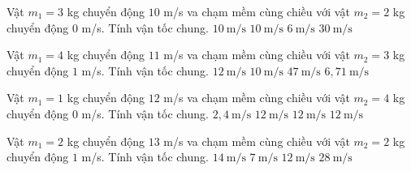 \begin{ex}
Vật $m_1=3$ kg chuyển động $10$ m/s va chạm mềm cùng chiều với vật $m_2=2$ kg chuyển động $0$ m/s. Tính vận tốc chung.
\choice
{$10\ \mathrm{m/s}$}
{$10\ \mathrm{m/s}$}
{\True $6\ \mathrm{m/s}$}
{$30\ \mathrm{m/s}$}
\end{ex}

\begin{ex}
Vật $m_1=4$ kg chuyển động $11$ m/s va chạm mềm cùng chiều với vật $m_2=3$ kg chuyển động $1$ m/s. Tính vận tốc chung.
\choice
{$12\ \mathrm{m/s}$}
{$10\ \mathrm{m/s}$}
{$47\ \mathrm{m/s}$}
{\True $6,71\ \mathrm{m/s}$}
\end{ex}

\begin{ex}
Vật $m_1=1$ kg chuyển động $12$ m/s va chạm mềm cùng chiều với vật $m_2=4$ kg chuyển động $0$ m/s. Tính vận tốc chung.
\choice
{\True $2,4\ \mathrm{m/s}$}
{$12\ \mathrm{m/s}$}
{$12\ \mathrm{m/s}$}
{$12\ \mathrm{m/s}$}
\end{ex}

\begin{ex}
Vật $m_1=2$ kg chuyển động $13$ m/s va chạm mềm cùng chiều với vật $m_2=2$ kg chuyển động $1$ m/s. Tính vận tốc chung.
\choice
{$14\ \mathrm{m/s}$}
{\True $7\ \mathrm{m/s}$}
{$12\ \mathrm{m/s}$}
{$28\ \mathrm{m/s}$}
\end{ex}

